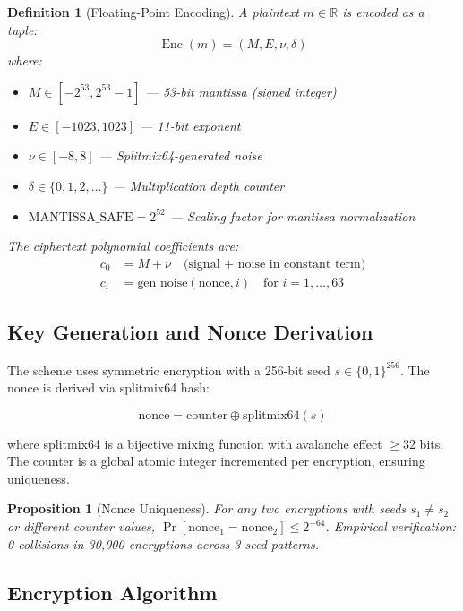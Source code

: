 \documentclass[11pt,a4paper]{article}
\newtheorem{definition}[theorem]{Definition}
\newtheorem{proposition}[theorem]{Proposition}
\DeclareMathOperator{\Enc}{Enc}
\begin{document}
\begin{definition}[Floating-Point Encoding]
\label{def:encoding}
A plaintext $m \in \mathbb{R}$ is encoded as a tuple:
\[
\Enc(m) = (M, E, \nu, \delta)
\]
where:
\begin{itemize}[leftmargin=*,itemsep=1pt]
    \item $M \in [-2^{53}, 2^{53}-1]$ — 53-bit mantissa (signed integer)
    \item $E \in [-1023, 1023]$ — 11-bit exponent
    \item $\nu \in [-8, 8]$ — Splitmix64-generated noise
    \item $\delta \in \{0, 1, 2, \ldots\}$ — Multiplication depth counter
    \item $\text{MANTISSA\_SAFE} = 2^{52}$ — Scaling factor for mantissa normalization
\end{itemize}
The ciphertext polynomial coefficients are:
\begin{align*}
c_0 &= M + \nu \quad \text{(signal + noise in constant term)} \\
c_i &= \text{gen\_noise}(\text{nonce}, i) \quad \text{for } i = 1, \ldots, 63
\end{align*}
\end{definition}

\subsection{Key Generation and Nonce Derivation}

The scheme uses symmetric encryption with a 256-bit seed $s \in \{0,1\}^{256}$. The nonce is derived via splitmix64 hash:

\begin{equation}
\label{eq:nonce}
\text{nonce} = \text{counter} \oplus \text{splitmix64}(s)
\end{equation}

where splitmix64 is a bijective mixing function with avalanche effect $\geq 32$ bits. The counter is a global atomic integer incremented per encryption, ensuring uniqueness.

\begin{proposition}[Nonce Uniqueness]
\label{prop:nonce}
For any two encryptions with seeds $s_1 \neq s_2$ or different counter values, $\Pr[\text{nonce}_1 = \text{nonce}_2] \leq 2^{-64}$. Empirical verification: 0 collisions in 30,000 encryptions across 3 seed patterns.
\end{proposition}

\subsection{Encryption Algorithm}
\end{document}
